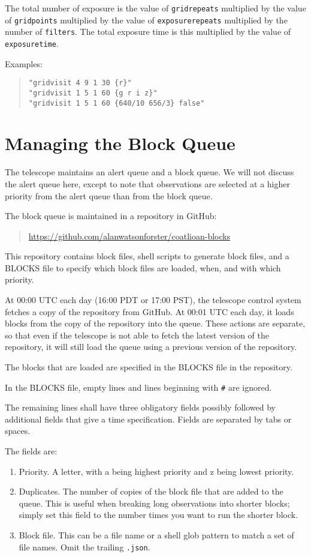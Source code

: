 The total number of exposure is the value of \verb|gridrepeats| multiplied by the value of \verb|gridpoints| multiplied by the value of \verb|exposurerepeats| multiplied by the number of \verb|filters|. The total exposure time is this multiplied by the value of \verb|exposuretime|.

Examples:
\begin{quote}
\begin{verbatim}
"gridvisit 4 9 1 30 {r}"
"gridvisit 1 5 1 60 {g r i z}"
"gridvisit 1 5 1 60 {640/10 656/3} false"
\end{verbatim}
\end{quote}

\section{Managing the Block Queue}

The telescope maintains an alert queue and a block queue. We will not discuss the alert queue here, except to note that observations are selected at a higher priority from the alert queue than from the block queue.

The block queue is maintained in a repository in GitHub:
\begin{quote}
\ifcoatlioan
\url{https://github.com/alanwatsonforster/coatlioan-blocks}
\fi    
\end{quote}
This repository contains block files, shell scripts to generate block files, and a BLOCKS file to specify which block files are loaded, when, and with which priority.

At 00:00 UTC each day (16:00 PDT or 17:00 PST), the telescope control system fetches a copy of the repository from GitHub. At 00:01 UTC each day, it loads blocks from the copy of the repository into the queue. These actions are separate, so that even if the telescope is not able to fetch the latest version of the repository, it will still load the queue using a previous version of the repository.

The blocks that are loaded are specified in the BLOCKS file in the repository. 

In the BLOCKS file, empty lines and lines beginning with \verb|#| are ignored.

The remaining lines shall have three obligatory fields possibly followed by additional fields that give a time specification. Fields are separated by tabs or spaces.

The fields are:

\begin{enumerate}
\item Priority. A letter, with a being highest priority and z being lowest
priority.
\item  Duplicates. The number of copies of the block file that are added to the
queue. This is useful when breaking long observations into shorter blocks; simply set this field to the number times you want to run the shorter block.

\item Block file. This can be a file name or a shell glob pattern to match a set
of file names. Omit the trailing \verb|.json|.
\end{enumerate}

